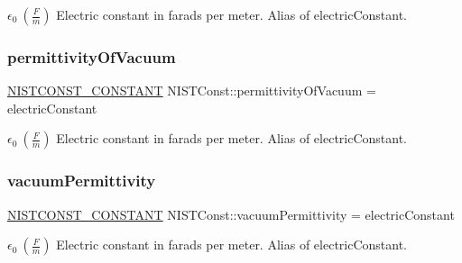 $\epsilon_0 \ (\frac{F}{m})$ Electric constant in farads per meter. Alias of electric\+Constant. \mbox{\label{group___n_i_s_t_const-_electric_constant_gaf36275428c537f6690fcf61c8939eca1}} 
\subsubsection{\texorpdfstring{permittivity\+Of\+Vacuum}{permittivityOfVacuum}}
{\footnotesize\ttfamily \mbox{\hyperlink{group___n_i_s_t_const-_macros_ga2b0fc1d7452373f816175dd86ce26729}{N\+I\+S\+T\+C\+O\+N\+S\+T\+\_\+\+C\+O\+N\+S\+T\+A\+NT}} N\+I\+S\+T\+Const\+::permittivity\+Of\+Vacuum = electric\+Constant}

$\epsilon_0 \ (\frac{F}{m})$ Electric constant in farads per meter. Alias of electric\+Constant. \mbox{\label{group___n_i_s_t_const-_electric_constant_ga2c514be966450065b16ef9e39a3bfaa9}} 
\subsubsection{\texorpdfstring{vacuum\+Permittivity}{vacuumPermittivity}}
{\footnotesize\ttfamily \mbox{\hyperlink{group___n_i_s_t_const-_macros_ga2b0fc1d7452373f816175dd86ce26729}{N\+I\+S\+T\+C\+O\+N\+S\+T\+\_\+\+C\+O\+N\+S\+T\+A\+NT}} N\+I\+S\+T\+Const\+::vacuum\+Permittivity = electric\+Constant}

$\epsilon_0 \ (\frac{F}{m})$ Electric constant in farads per meter. Alias of electric\+Constant. 